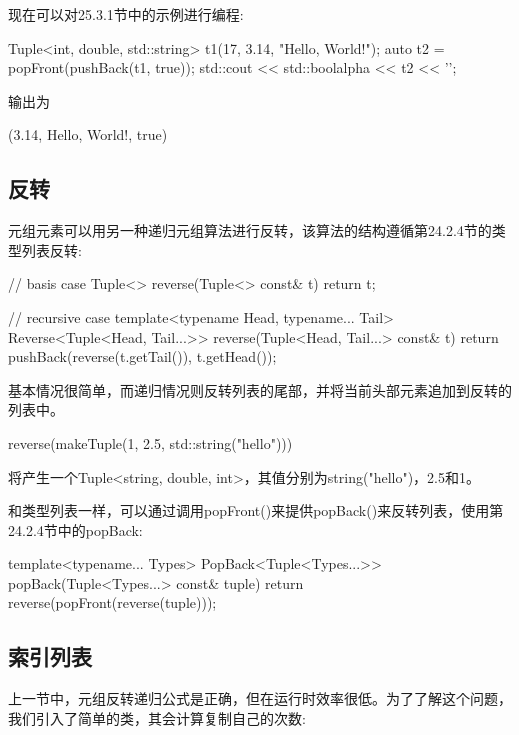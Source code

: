 现在可以对25.3.1节中的示例进行编程:

\begin{cpp}
Tuple<int, double, std::string> t1(17, 3.14, "Hello, World!");
auto t2 = popFront(pushBack(t1, true));
std::cout << std::boolalpha << t2 << '\n';
\end{cpp}

输出为

\begin{shell}
(3.14, Hello, World!, true)
\end{shell}

\subsection{反转}

元组元素可以用另一种递归元组算法进行反转，该算法的结构遵循第24.2.4节的类型列表反转:

\begin{cpp}
// basis case
Tuple<> reverse(Tuple<> const& t)
{
	return t;
}

// recursive case
template<typename Head, typename... Tail>
Reverse<Tuple<Head, Tail...>> reverse(Tuple<Head, Tail...> const& t)
{
	return pushBack(reverse(t.getTail()), t.getHead());
}
\end{cpp}

基本情况很简单，而递归情况则反转列表的尾部，并将当前头部元素追加到反转的列表中。

\begin{cpp}
reverse(makeTuple(1, 2.5, std::string("hello")))
\end{cpp}

将产生一个Tuple<string, double, int>，其值分别为string("hello")，2.5和1。

和类型列表一样，可以通过调用popFront()来提供popBack()来反转列表，使用第24.2.4节中的popBack:

\begin{cpp}
template<typename... Types>
PopBack<Tuple<Types...>>
popBack(Tuple<Types...> const& tuple)
{
	return reverse(popFront(reverse(tuple)));
}
\end{cpp}

\subsection{索引列表}

上一节中，元组反转递归公式是正确，但在运行时效率很低。为了了解这个问题，我们引入了简单的类，其会计算复制自己的次数:

